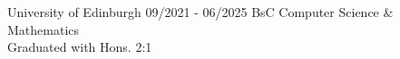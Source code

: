 \documentclass[../../cv-cs.tex]{subfiles}
\begin{document}
\vspace{-2pt}
\cvmetaevent
{University of Edinburgh}
{09/2021 - 06/2025}
{BsC Computer Science \& \\ Mathematics \\ Graduated with Hons. 2:1}
{}
\end{document}
